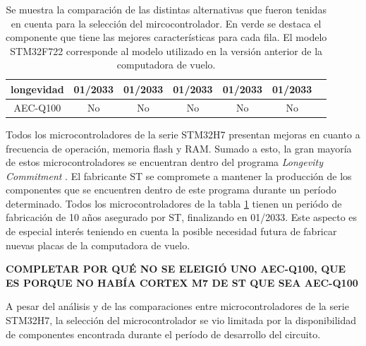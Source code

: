 \begin{table}[H]
\begin{tabular}{|c||c|c|c|c|c|c|}
        \hline
        longevidad & \cellcolor{green!25}01/2033 & \cellcolor{green!25}01/2033 & \cellcolor{green!25}01/2033 & \cellcolor{green!25}01/2033 & \cellcolor{green!25}01/2033\\
        \hline
        AEC-Q100 & No & No & No & No & No\\
        \hline       
    \end{tabular}
    \caption{Se muestra la comparación de las distintas alternativas que fueron tenidas en cuenta para la selección del mircocontrolador. En verde se destaca el componente que tiene las mejores características para cada fila. El modelo STM32F722 corresponde al modelo utilizado en la versión anterior de la computadora de vuelo.}
    \label{tab:comparacion_MCUs}
\end{table}

Todos los microcontroladores de la serie STM32H7 presentan mejoras en cuanto a frecuencia de operación, memoria flash y RAM. Sumado a esto, la gran mayoría de estos microcontroladores se encuentran dentro del programa \textit{Longevity Commitment} \cite{longevity_ST}. El fabricante ST se compromete a mantener la producción de los componentes que se encuentren dentro de este programa durante un período determinado. Todos los microcontroladores de la tabla \ref{tab:comparacion_MCUs} tienen un periódo de fabricación de 10 años asegurado por ST, finalizando en 01/2033. Este aspecto es de especial interés teniendo en cuenta la posible necesidad futura de fabricar nuevas placas de la computadora de vuelo.

\textbf{{\color{red} COMPLETAR POR QUÉ NO SE ELEIGIÓ UNO AEC-Q100, QUE ES PORQUE NO HABÍA CORTEX M7 DE ST QUE SEA AEC-Q100}}



A pesar del análisis y de las comparaciones entre microcontroladores de la serie STM32H7, la selección del microcontrolador se vio limitada por la disponibilidad de componentes encontrada durante el período de desarrollo del circuito.

